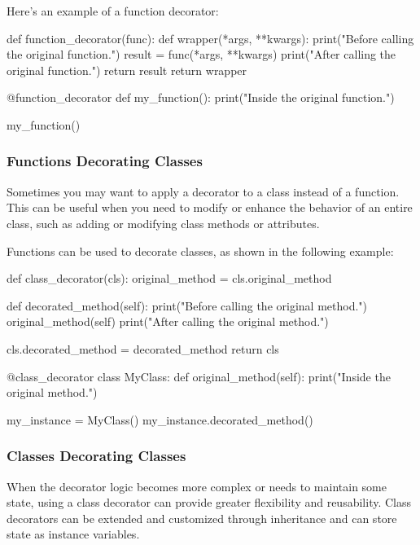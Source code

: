 \documentclass[12pt, a4paper, oneside, justified]{article}
\begin{document}
Here's an example of a function decorator:
\begin{python}
    def function_decorator(func):
        def wrapper(*args, **kwargs):
            print("Before calling the original function.")
            result = func(*args, **kwargs)
            print("After calling the original function.")
            return result
        return wrapper

    @function_decorator
    def my_function():
        print("Inside the original function.")

    my_function()
\end{python}

\subsubsection*{Functions Decorating Classes}
Sometimes you may want to apply a decorator to a class instead of a function. This can be useful
when you need to modify or enhance the behavior of an entire class, such as adding or modifying
class methods or attributes. 

Functions can be used to decorate classes, as shown in the following
example:
\begin{python}
    def class_decorator(cls):
        original_method = cls.original_method

        def decorated_method(self):
            print("Before calling the original method.")
            original_method(self)
            print("After calling the original method.")

        cls.decorated_method = decorated_method
        return cls

    @class_decorator
    class MyClass:
        def original_method(self):
            print("Inside the original method.")

    my_instance = MyClass()
    my_instance.decorated_method()
\end{python}

\subsubsection*{Classes Decorating Classes}
When the decorator logic becomes more complex or needs to maintain some state, using a class
decorator can provide greater flexibility and reusability. Class decorators can be extended and
customized through inheritance and can store state as instance variables. 
\end{document}
